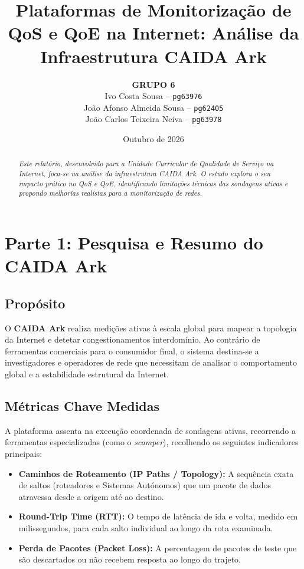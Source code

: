 \documentclass[11pt, a4paper]{article}
\title{\textbf{Plataformas de Monitorização de QoS e QoE na Internet: Análise da Infraestrutura CAIDA Ark}}
\author{
  \textbf{GRUPO 6} \\[0.4cm]
  Ivo Costa Sousa -- \texttt{pg63976} \\[0.15cm]
  João Afonso Almeida Sousa -- \texttt{pg62405} \\[0.15cm]
  João Carlos Teixeira Neiva -- \texttt{pg63978} \\[0.15cm]
}
\date{Outubro de 2026}
\begin{document}
\maketitle

\begin{abstract}
\textit{Este relatório, desenvolvido para a Unidade Curricular de Qualidade de Serviço na Internet, foca-se na análise da infraestrutura CAIDA Ark. O estudo explora o seu impacto prático no QoS e QoE, identificando limitações técnicas das sondagens ativas e propondo melhorias realistas para a monitorização de redes.}
\end{abstract}

\section{Parte 1: Pesquisa e Resumo do CAIDA Ark}

\subsection{Propósito}
O \textbf{CAIDA Ark} realiza medições ativas à escala global para mapear a topologia da Internet e detetar congestionamentos interdomínio. Ao contrário de ferramentas comerciais para o consumidor final, o sistema destina-se a investigadores e operadores de rede que necessitam de analisar o comportamento global e a estabilidade estrutural da Internet.

\subsection{Métricas Chave Medidas}
A plataforma assenta na execução coordenada de sondagens ativas, recorrendo a ferramentas especializadas (como o \textit{scamper}), recolhendo os seguintes indicadores principais:
\begin{itemize}
    \item \textbf{Caminhos de Roteamento (IP Paths / Topology):} A sequência exata de saltos (roteadores e Sistemas Autónomos) que um pacote de dados atravessa desde a origem até ao destino.
    \item \textbf{Round-Trip Time (RTT):} O tempo de latência de ida e volta, medido em milissegundos, para cada salto individual ao longo da rota examinada.
    \item \textbf{Perda de Pacotes (Packet Loss):} A percentagem de pacotes de teste que são descartados ou não recebem resposta ao longo do trajeto.
\end{itemize}
\end{document}
